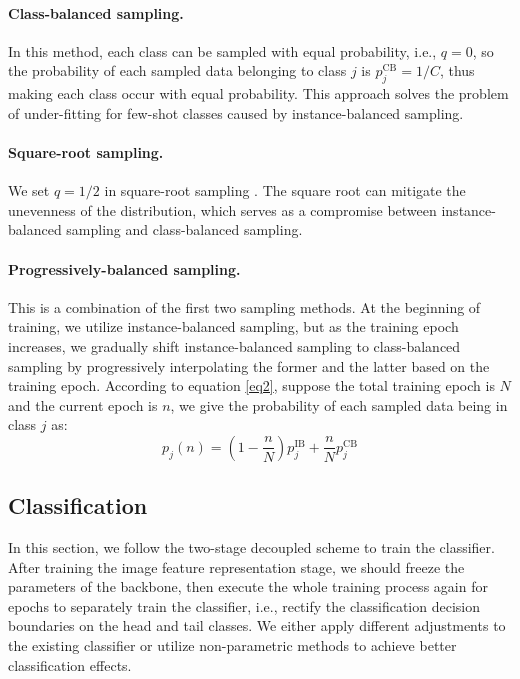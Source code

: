 \documentclass{article}
\begin{document}
\paragraph{Class-balanced sampling.}In this method, each class can be sampled with equal probability, i.e., $q=0$, so the probability of each sampled data belonging to class $j$ is $p_j^{\mathrm{CB}}=1/C$, thus making each class occur with equal probability. This approach solves the problem of under-fitting for few-shot classes caused by instance-balanced sampling.

\paragraph{Square-root sampling.}We set $q=1/2$ in square-root sampling \cite{mikolov2013distributed}. The square root can mitigate the unevenness of the distribution, which serves as a compromise between instance-balanced sampling and class-balanced sampling.

\paragraph{Progressively-balanced sampling.} This is a combination of the first two sampling methods. At the beginning of training, we utilize instance-balanced sampling, but as the training epoch increases, we gradually shift instance-balanced sampling to class-balanced sampling by progressively interpolating the former and the latter based on the training epoch. According to equation \ref{eq2}, suppose the total training epoch is $N$ and the current epoch is $n$, we give the probability of each sampled data being in class $j$ as:
\begin{equation}
    p_j(n)=(1-\frac{n}{N})p_j^{\mathrm{IB}}+\frac{n}{N}p_j^{\mathrm{CB}}
    \label{eq2}
\end{equation}


\subsection{Classification}

In this section, we follow the two-stage decoupled scheme to train the classifier. After training the image feature representation stage, we should freeze the parameters of the backbone, then execute the whole training process again for epochs to separately train the classifier, i.e., rectify the classification decision boundaries on the head and tail classes. We either apply different adjustments to the existing classifier or utilize non-parametric methods to achieve better classification effects.
\end{document}
